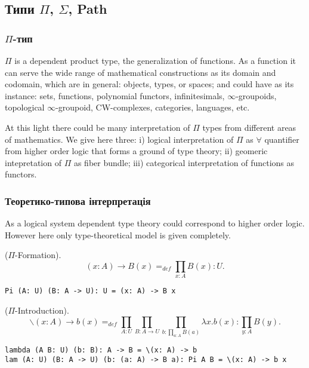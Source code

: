 \subsection{Типи $\Pi$, $\Sigma$, Path}

\subsubsection{$\Pi$-тип}

$\Pi$ is a dependent product type, the generalization of functions.
As a function it can serve the wide range of mathematical constructions
as its domain and codomain, which are in general: objects, types, or spaces;
and could have as its instance: sets, functions, polynomial functors,
infinitesimals, $\infty$-groupoids, topological $\infty$-groupoid, CW-complexes,
categories, languages, etc.

At this light there could be many interpretation of $\Pi$ types from different
areas of mathematics. We give here three: i) logical interpretation of $\Pi$ as
$\forall$ quantifier from higher order logic
that forms a ground of type theory; ii) geomeric intepretation of $\Pi$ as fiber bundle;
iii) categorical interpretation of functions as functors.

\subsubsection*{Теоретико-типова інтерпретація}

As a logical system dependent type theory could correspond to higher order logic.
However here only type-theoretical model is given completely.

\begin{definition} ($\Pi$-Formation).
$$(x: A) \rightarrow B(x) =_{def} \prod_{x:A}B(x) : U.$$
\begin{lstlisting}
Pi (A: U) (B: A -> U): U = (x: A) -> B x
\end{lstlisting}
\end{definition}

\begin{definition} ($\Pi$-Introduction).
$$\backslash (x: A) \rightarrow b(x) =_{def} \prod_{A:U}\prod_{B:A \rightarrow U}\prod_{b:\prod_{a:A}B(a)}\lambda x.b(x) : \prod_{y:A}B(y).$$
\begin{lstlisting}
lambda (A B: U) (b: B): A -> B = \(x: A) -> b
lam (A: U) (B: A -> U) (b: (a: A) -> B a): Pi A B = \(x: A) -> b x
\end{lstlisting}
\end{definition}

